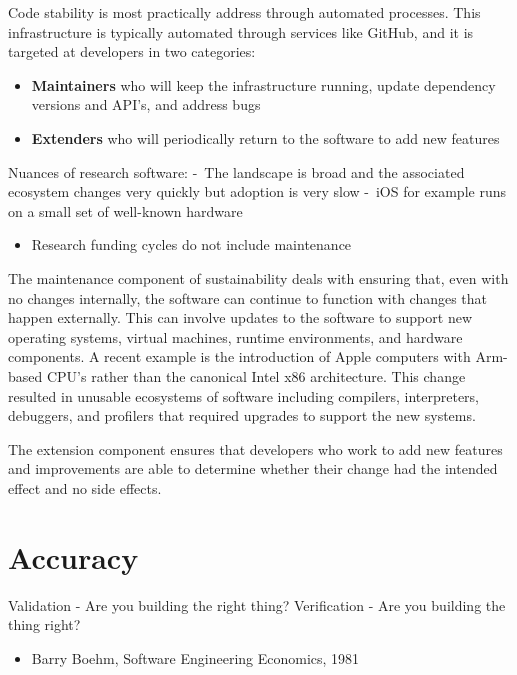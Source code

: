\documentclass[]{nrel}
\begin{document}
Code stability is most practically address through automated processes.
This infrastructure is typically automated through services like GitHub,
and it is targeted at developers in two categories:
\begin{itemize}
\item \textbf{Maintainers} who will keep the infrastructure running, update dependency versions and API’s,
and address bugs

\item \textbf{Extenders} who will periodically return to the software to add new features

\end{itemize}

Nuances of research software:
- The landscape is broad and the associated ecosystem changes very quickly but adoption is very slow
- iOS for example runs on a small set of well-known hardware
\begin{itemize}
\item Research funding cycles do not include maintenance

\end{itemize}

The maintenance component of sustainability deals with ensuring that, even with no changes
internally, the software can continue to function with changes that happen externally.
This can involve updates to the software to support new operating systems, virtual machines,
runtime environments, and hardware components.
A recent example is the introduction of Apple computers with Arm-based CPU’s rather than the
canonical Intel x86 architecture.
This change resulted in unusable ecosystems of software including compilers, interpreters,
debuggers, and profilers that required upgrades to support the new systems.

The extension component ensures that developers who work to add new features and improvements are
able to determine whether their change had the intended effect and no side effects.


\chapter{Accuracy}
Validation - Are you building the right thing?
Verification - Are you building the thing right?
\begin{itemize}
\item Barry Boehm, Software Engineering Economics, 1981

\end{itemize}
\end{document}
